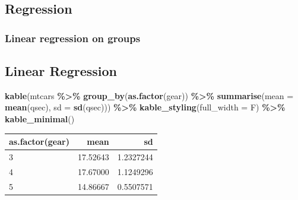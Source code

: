\documentclass[
]{article}
\newenvironment{Shaded}{\begin{snugshade}}{\end{snugshade}}
\newcommand{\AttributeTok}[1]{\textcolor[rgb]{0.13,0.29,0.53}{#1}}
\newcommand{\FunctionTok}[1]{\textcolor[rgb]{0.13,0.29,0.53}{\textbf{#1}}}
\newcommand{\NormalTok}[1]{#1}
\newcommand{\SpecialCharTok}[1]{\textcolor[rgb]{0.81,0.36,0.00}{\textbf{#1}}}
\begin{document}
\hypertarget{regression}{%
\subsection{Regression}\label{regression}}

\hypertarget{linear-regression-on-groups}{%
\subsubsection{Linear regression on groups}\label{linear-regression-on-groups}}

\hypertarget{linear-regression}{%
\subsection{Linear Regression}\label{linear-regression}}

\begin{Shaded}
\begin{Highlighting}[]
\FunctionTok{kable}\NormalTok{(mtcars }\SpecialCharTok{\%\textgreater{}\%}  \FunctionTok{group\_by}\NormalTok{(}\FunctionTok{as.factor}\NormalTok{(gear)) }\SpecialCharTok{\%\textgreater{}\%}
\FunctionTok{summarise}\NormalTok{(}\AttributeTok{mean =} \FunctionTok{mean}\NormalTok{(qsec), }\AttributeTok{sd =} \FunctionTok{sd}\NormalTok{(qsec))) }\SpecialCharTok{\%\textgreater{}\%}
  \FunctionTok{kable\_styling}\NormalTok{(}\AttributeTok{full\_width =}\NormalTok{ F) }\SpecialCharTok{\%\textgreater{}\%}
  \FunctionTok{kable\_minimal}\NormalTok{()}
\end{Highlighting}
\end{Shaded}

\begin{table}
\centering
\begin{tabular}{l|r|r}
\hline
as.factor(gear) & mean & sd\\
\hline
3 & 17.52643 & 1.2327244\\
\hline
4 & 17.67000 & 1.1249296\\
\hline
5 & 14.86667 & 0.5507571\\
\hline
\end{tabular}
\end{table}
\end{document}
